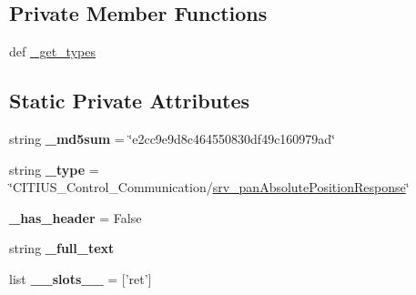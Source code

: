 \subsection*{\-Private \-Member \-Functions}
\begin{DoxyCompactItemize}
\item 
def \hyperlink{class_c_i_t_i_u_s___control___communication_1_1srv_1_1__srv__pan_absolute_position_1_1srv__pan_absolute_position_response_ae0d8156dc6e8c67e009dffb0a255bc49}{\-\_\-get\-\_\-types}
\end{DoxyCompactItemize}
\subsection*{\-Static \-Private \-Attributes}
\begin{DoxyCompactItemize}
\item 
\hypertarget{class_c_i_t_i_u_s___control___communication_1_1srv_1_1__srv__pan_absolute_position_1_1srv__pan_absolute_position_response_a197eb7c06b65305241f5d628d545f4d8}{string {\bfseries \-\_\-md5sum} = \char`\"{}e2cc9e9d8c464550830df49c160979ad\char`\"{}}\label{class_c_i_t_i_u_s___control___communication_1_1srv_1_1__srv__pan_absolute_position_1_1srv__pan_absolute_position_response_a197eb7c06b65305241f5d628d545f4d8}

\item 
\hypertarget{class_c_i_t_i_u_s___control___communication_1_1srv_1_1__srv__pan_absolute_position_1_1srv__pan_absolute_position_response_a9a85e7c69ed96f25897c4950cb7a1b5d}{string {\bfseries \-\_\-type} = \char`\"{}\-C\-I\-T\-I\-U\-S\-\_\-\-Control\-\_\-\-Communication/\hyperlink{class_c_i_t_i_u_s___control___communication_1_1srv_1_1__srv__pan_absolute_position_1_1srv__pan_absolute_position_response}{srv\-\_\-pan\-Absolute\-Position\-Response}\char`\"{}}\label{class_c_i_t_i_u_s___control___communication_1_1srv_1_1__srv__pan_absolute_position_1_1srv__pan_absolute_position_response_a9a85e7c69ed96f25897c4950cb7a1b5d}

\item 
\hypertarget{class_c_i_t_i_u_s___control___communication_1_1srv_1_1__srv__pan_absolute_position_1_1srv__pan_absolute_position_response_a89ea2b564d1b6936c8d68d86562006a5}{{\bfseries \-\_\-has\-\_\-header} = \-False}\label{class_c_i_t_i_u_s___control___communication_1_1srv_1_1__srv__pan_absolute_position_1_1srv__pan_absolute_position_response_a89ea2b564d1b6936c8d68d86562006a5}

\item 
string {\bfseries \-\_\-full\-\_\-text}
\item 
\hypertarget{class_c_i_t_i_u_s___control___communication_1_1srv_1_1__srv__pan_absolute_position_1_1srv__pan_absolute_position_response_a1cb82fd77e19d2c3aa2f73b3ca330522}{list {\bfseries \-\_\-\-\_\-slots\-\_\-\-\_\-} = \mbox{[}'ret'\mbox{]}}\label{class_c_i_t_i_u_s___control___communication_1_1srv_1_1__srv__pan_absolute_position_1_1srv__pan_absolute_position_response_a1cb82fd77e19d2c3aa2f73b3ca330522}


\end{DoxyCompactItemize}
